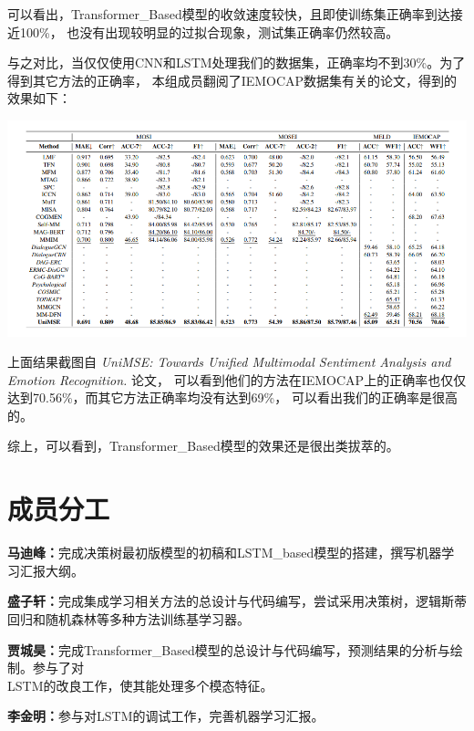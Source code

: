\documentclass[11pt]{article}
\begin{document}
            可以看出，Transformer\_Based模型的收敛速度较快，且即使训练集正确率到达接近100\%，
            也没有出现较明显的过拟合现象，测试集正确率仍然较高。
            
            与之对比，当仅仅使用CNN和LSTM处理我们的数据集，正确率均不到30\%。为了得到其它方法的正确率，
            本组成员翻阅了IEMOCAP数据集有关的论文，得到的效果如下：

            \begin{center}
                \includegraphics[scale=0.9]{graph/result7.png}
            \end{center}

            上面结果截图自\textit{ UniMSE: Towards Unified Multimodal Sentiment Analysis and Emotion Recognition. }论文，
            可以看到他们的方法在IEMOCAP上的正确率也仅仅达到70.56\%，而其它方法正确率均没有达到69\%，
            可以看出我们的正确率是很高的。
            
            综上，可以看到，Transformer\_Based模型的效果还是很出类拔萃的。

    \section{成员分工}
    \textbf{马迪峰：}完成决策树最初版模型的初稿和LSTM\_based模型的搭建，撰写机器学习汇报大纲。

    \textbf{盛子轩：}完成集成学习相关方法的总设计与代码编写，尝试采用决策树，逻辑斯蒂回归和随机森林等多种方法训练基学习器。

    \textbf{贾城昊：}完成Transformer\_Based模型的总设计与代码编写，预测结果的分析与绘制。参与了对\\LSTM的改良工作，使其能处理多个模态特征。

    \textbf{李金明：}参与对LSTM的调试工作，完善机器学习汇报。
\end{document}
